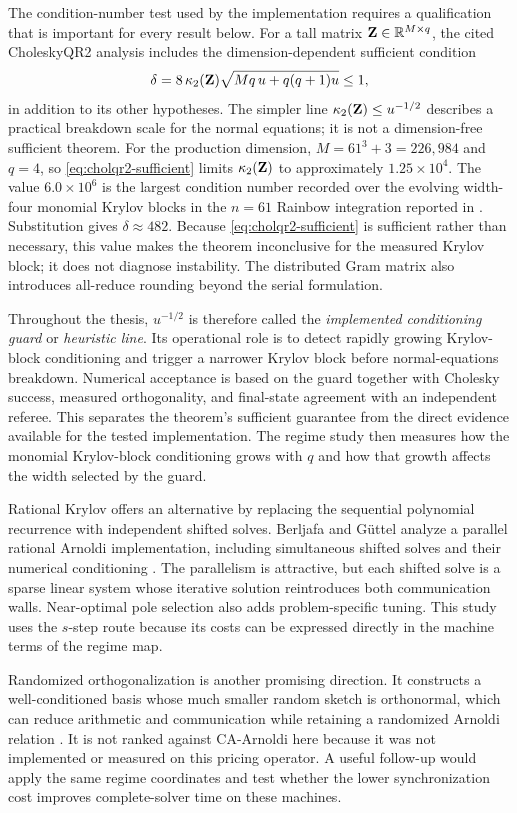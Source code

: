 The condition-number test used by the implementation requires a qualification that is important for every result below. For a tall matrix $\mathbf{Z}\in\mathbb{R}^{M\times q}$, the cited CholeskyQR2 analysis includes the dimension-dependent sufficient condition
\begin{equation}
\delta = 8\,\kappa_2(\mathbf{Z})
\sqrt{Mq\,u+q(q+1)u}\le 1,
\label{eq:cholqr2-sufficient}
\end{equation}
in addition to its other hypotheses. The simpler line
$\kappa_2(\mathbf{Z})\le u^{-1/2}$ describes a practical breakdown scale for the normal equations; it is not a dimension-free sufficient theorem.
For the production dimension, $M=61^3+3=226{,}984$ and $q=4$, so \eqref{eq:cholqr2-sufficient} limits $\kappa_2(\mathbf{Z})$ to approximately $1.25\times10^4$. The value $6.0\times10^6$ is the largest condition number recorded over the evolving width-four monomial Krylov blocks in the $n=61$ Rainbow integration reported in . Substitution gives $\delta\approx482$. Because \eqref{eq:cholqr2-sufficient} is sufficient rather than necessary, this value makes the theorem inconclusive for the measured Krylov block; it does not diagnose instability. The distributed Gram matrix also introduces all-reduce rounding beyond the serial formulation.

Throughout the thesis, $u^{-1/2}$ is therefore called the \emph{implemented conditioning guard} or \emph{heuristic line}. Its operational role is to detect rapidly growing Krylov-block conditioning and trigger a narrower Krylov block before normal-equations breakdown. Numerical acceptance is based on the guard together with Cholesky success, measured orthogonality, and final-state agreement with an independent referee. This separates the theorem's sufficient guarantee from the direct evidence available for the tested implementation. The regime study then measures how the monomial Krylov-block conditioning grows with $q$ and how that growth affects the width selected by the guard.

Rational Krylov offers an alternative by replacing the sequential polynomial recurrence with independent shifted solves. Berljafa and G\"uttel analyze a parallel rational Arnoldi implementation, including simultaneous shifted solves and their numerical conditioning \cite{berljafa-guttel-2017}. The parallelism is attractive, but each shifted solve is a sparse linear system whose iterative solution reintroduces both communication walls. Near-optimal pole selection also adds problem-specific tuning. This study uses the $s$-step route because its costs can be expressed directly in the machine terms of the regime map.

Randomized orthogonalization is another promising direction. It constructs a well-conditioned basis whose much smaller random sketch is orthonormal, which can reduce arithmetic and communication while retaining a randomized Arnoldi relation \cite{de-damas-grigori-2025}. It is not ranked against CA-Arnoldi here because it was not implemented or measured on this pricing operator. A useful follow-up would apply the same regime coordinates and test whether the lower synchronization cost improves complete-solver time on these machines.

